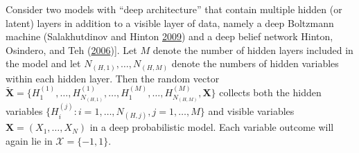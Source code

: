 \documentclass[]{article}
\theoremstyle{definition}
\begin{document}
Consider two models with ``deep architecture'' that contain multiple
hidden (or latent) layers in addition to a visible layer of data, namely
a deep Boltzmann machine (Salakhutdinov and Hinton
\protect\hyperlink{ref-salakhutdinov2009deep}{2009}) and a deep belief
network Hinton, Osindero, and Teh
(\protect\hyperlink{ref-hinton2006fast}{2006}){]}. Let \(M\) denote the
number of hidden layers included in the model and let
\(N_{(H,1)}, \dots, N_{(H,M)}\) denote the numbers of hidden variables
within each hidden layer. Then the random vector
\(\tilde{\boldsymbol X} = \{H^{(1)}_1, \dots, H^{(1)}_{N_{(H,1)}}, \dots, H^{(M)}_1, \dots, H^{(M)}_{N_{(H,M)}}, \boldsymbol X\}\)
collects both the hidden variables
\(\{ H_{i}^{(j)} : i=1,\ldots, N_{(H,j)}, j=1,\ldots,M\}\) and visible
variables \(\boldsymbol X =(X_1,\ldots,X_N)\) in a deep probabilistic
model. Each variable outcome will again lie in
\(\mathcal{X} = \{-1,1\}\).
\end{document}
